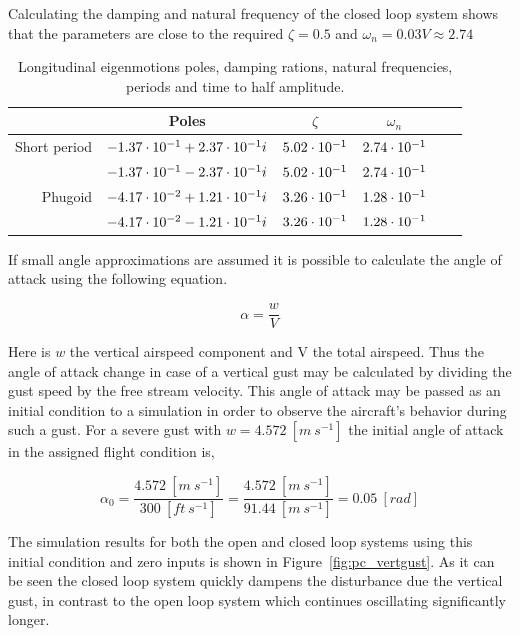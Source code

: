 Calculating the damping and natural frequency of the closed loop system shows that the parameters are close to the required $\zeta=0.5$ and $\omega_n=0.03V\approx 2.74$
\begin{table}[h!]
    \centering
    \begin{tabular}{ r | c c c c c }
                     & Poles                           & $\zeta$        & $\omega_n$     \\ \hline \hline
        Short period & $-1.37\cdot 10^{-1} + 2.37\cdot 10^{-1}i$ & $5.02\cdot 10^{-1}$ & $2.74\cdot 10^{-1}$ \\  
                     & $-1.37\cdot 10^{-1} - 2.37\cdot 10^{-1}i$ & $5.02\cdot 10^{-1}$ & $2.74\cdot 10^{-1}$ \\ \hline
        Phugoid      & $-4.17\cdot 10^{-2} + 1.21\cdot 10^{-1}i$ & $3.26\cdot 10^{-1}$ & $1.28\cdot 10^{-1}$ \\   
                     & $-4.17\cdot 10^{-2} - 1.21\cdot 10^{-1}i$ & $3.26\cdot 10^{-1}$ & $1.28\cdot 10^{-1}$
    \end{tabular}
    \caption{Longitudinal eigenmotions poles, damping rations, natural frequencies, periods and time to half amplitude.}
\end{table}

If small angle approximations are assumed it is possible to calculate the angle of attack using the following equation.

\begin{equation}
    \alpha = \frac{w}{V}
\end{equation}

Here is $w$ the vertical airspeed component and V the total airspeed. Thus the angle of attack change in case of a vertical gust may be calculated by dividing the gust speed by the free stream velocity. This angle of attack may be passed as an initial condition to a simulation in order to observe the aircraft's behavior during such a gust. For a severe gust with $w=4.572\ [m\ s^{-1}]$ the initial angle of attack in the assigned flight condition is,

\begin{equation}
    \alpha_0=\frac{4.572\ [m\ s^{-1}]}{300\ [ft\ s^{-1}]}=\frac{4.572\ [m\ s^{-1}]}{91.44\ [m\ s^{-1}]} = 0.05\ [rad]
\end{equation}

The simulation results for both the open and closed loop systems using this initial condition and zero inputs is shown in Figure~\ref{fig:pc_vertgust}. As it can be seen the closed loop system quickly dampens the disturbance due the vertical gust, in contrast to the open loop system which continues oscillating significantly longer.

